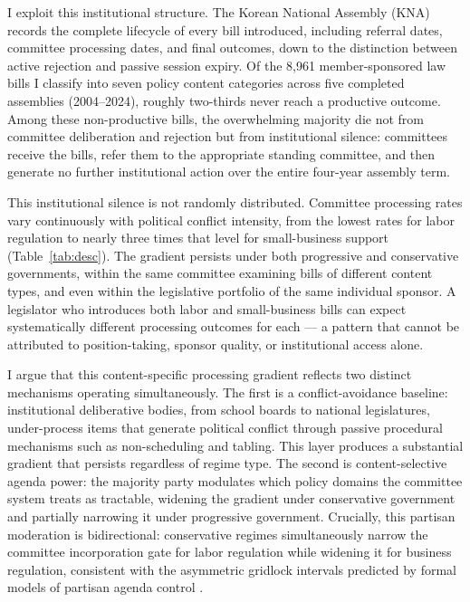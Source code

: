 \documentclass[11pt]{article}
\begin{document}
I exploit this institutional structure. The Korean National Assembly (KNA) records the complete lifecycle of every bill introduced, including referral dates, committee processing dates, and final outcomes, down to the distinction between active rejection and passive session expiry. Of the 8,961 member-sponsored law bills I classify into seven policy content categories across five completed assemblies (2004--2024), roughly two-thirds never reach a productive outcome. Among these non-productive bills, the overwhelming majority die not from committee deliberation and rejection but from institutional silence: committees receive the bills, refer them to the appropriate standing committee, and then generate no further institutional action over the entire four-year assembly term.

This institutional silence is not randomly distributed. Committee processing rates vary continuously with political conflict intensity, from the lowest rates for labor regulation to nearly three times that level for small-business support (Table~\ref{tab:desc}). The gradient persists under both progressive and conservative governments, within the same committee examining bills of different content types, and even within the legislative portfolio of the same individual sponsor. A legislator who introduces both labor and small-business bills can expect systematically different processing outcomes for each --- a pattern that cannot be attributed to position-taking, sponsor quality, or institutional access alone.

I argue that this content-specific processing gradient reflects two distinct mechanisms operating simultaneously. The first is a conflict-avoidance baseline: institutional deliberative bodies, from school boards \citep{holman2025} to national legislatures, under-process items that generate political conflict through passive procedural mechanisms such as non-scheduling and tabling. This layer produces a substantial gradient that persists regardless of regime type. The second is content-selective agenda power: the majority party modulates which policy domains the committee system treats as tractable, widening the gradient under conservative government and partially narrowing it under progressive government. Crucially, this partisan moderation is bidirectional: conservative regimes simultaneously narrow the committee incorporation gate for labor regulation while widening it for business regulation, consistent with the asymmetric gridlock intervals predicted by formal models of partisan agenda control \citep{crosson2018}.
\end{document}
